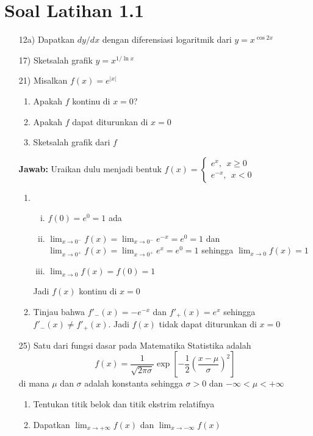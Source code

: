 \documentclass{article}
\begin{document}
\section*{Soal Latihan 1.1}
\begin{enumerate}
	\item[12a)] Dapatkan $dy/dx$ dengan diferensiasi logaritmik dari $y=x^{\cos 2x}$
	\item[17)] Sketsalah grafik $y=x^{1/\ln x}$
	\item[21)] Misalkan $f(x)=e^{|x|}$
	\begin{enumerate}
		\item Apakah $f$ kontinu di $x=0$?
		\item Apakah $f$ dapat diturunkan di $x=0$
		\item Sketsalah grafik dari $f$
	\end{enumerate}
	\textbf{Jawab:}
	Uraikan dulu menjadi bentuk $f(x)=\begin{cases}e^x, ~~x\geq 0\\e^{-x},~~x<0\end{cases}$
	\begin{enumerate}
		\item \begin{enumerate}[i.]
			\item $f(0)=e^0=1$ ada
			\item $\displaystyle \lim_{x\rightarrow 0^-}f(x)=\lim_{x\rightarrow 0^-}e^{-x}=e^0=1$ dan $\displaystyle \lim_{x\rightarrow 0^+}f(x)=\lim_{x\rightarrow 0^+}e^x=e^0=1$ sehingga $\displaystyle \lim_{x\rightarrow 0}f(x)=1$ 
			\item $\displaystyle \lim_{x\rightarrow 0}f(x)=f(0)=1$
		\end{enumerate}
		Jadi $f(x)$ kontinu di $x=0$
		\item Tinjau bahwa $f'_-(x)=-e^{-x}$ dan $f'_+(x)=e^x$ sehingga $f'_-(x)\neq f'_+(x)$. Jadi $f(x)$ tidak dapat diturunkan di $x=0$
	\end{enumerate}
	\item[25)] Satu dari fungsi dasar pada Matematika Statistika adalah
	$$ f(x) = \dfrac{1}{\sqrt{2\pi\sigma}}\exp\left[-\dfrac{1}{2}(\dfrac{x-\mu}{\sigma})^2\right]$$ 
	di mana $\mu$ dan $\sigma$ adalah konstanta sehingga $\sigma>0$ dan $-\infty<\mu<+\infty$
	\begin{enumerate}
		\item Tentukan titik belok dan titik ekstrim relatifnya
		\item Dapatkan $\displaystyle \lim_{x\rightarrow +\infty} f(x)$ dan $\displaystyle \lim_{x\rightarrow -\infty} f(x)$

\end{enumerate}
\end{enumerate}
\end{document}
